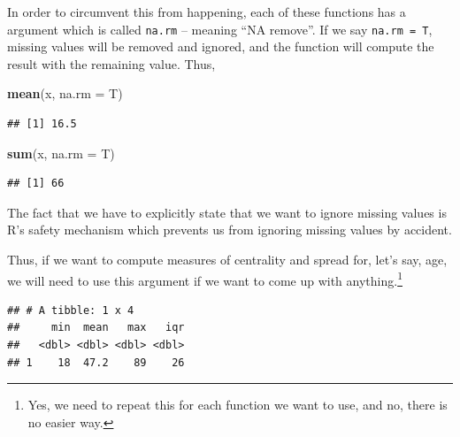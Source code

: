 \documentclass[]{tufte-book}
\newenvironment{Shaded}{}{}
\newcommand{\KeywordTok}[1]{\textcolor[rgb]{0.00,0.44,0.13}{\textbf{#1}}}
\newcommand{\DataTypeTok}[1]{\textcolor[rgb]{0.56,0.13,0.00}{#1}}
\newcommand{\StringTok}[1]{\textcolor[rgb]{0.25,0.44,0.63}{#1}}
\newcommand{\OperatorTok}[1]{\textcolor[rgb]{0.40,0.40,0.40}{#1}}
\newcommand{\NormalTok}[1]{#1}
\begin{document}
In order to circumvent this from happening, each of these functions has
a argument which is called \texttt{na.rm} -- meaning ``NA remove''. If
we say \texttt{na.rm\ =\ T}, missing values will be removed and ignored,
and the function will compute the result with the remaining value. Thus,

\begin{Shaded}
\begin{Highlighting}[]
\KeywordTok{mean}\NormalTok{(x, }\DataTypeTok{na.rm =}\NormalTok{ T)}
\end{Highlighting}
\end{Shaded}

\begin{verbatim}
## [1] 16.5
\end{verbatim}

\begin{Shaded}
\begin{Highlighting}[]
\KeywordTok{sum}\NormalTok{(x, }\DataTypeTok{na.rm =}\NormalTok{ T)}
\end{Highlighting}
\end{Shaded}

\begin{verbatim}
## [1] 66
\end{verbatim}

The fact that we have to explicitly state that we want to ignore missing
values is R's safety mechanism which prevents us from ignoring missing
values by accident.

Thus, if we want to compute measures of centrality and spread for, let's
say, age, we will need to use this argument if we want to come up with
anything.\footnote{Yes, we need to repeat this for each function we want
  to use, and no, there is no easier way.}

\begin{Shaded}
\end{Shaded}

\begin{verbatim}
## # A tibble: 1 x 4
##     min  mean   max   iqr
##   <dbl> <dbl> <dbl> <dbl>
## 1    18  47.2    89    26
\end{verbatim}
\end{document}
